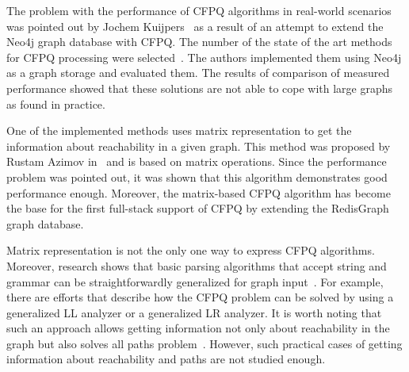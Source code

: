 The problem with the performance of CFPQ algorithms in real-world scenarios was pointed out by Jochem Kuijpers~\cite{10.1145/3335783.3335791} as a result of an attempt to extend the Neo4j graph database with CFPQ. The number of the state of the art methods for CFPQ processing were selected~\cite{10.1007/978-3-319-91662-0_17, hellingsRelational, 10.1145/3167132.3167265, 10.1145/3398682.3399163}. The authors implemented them using Neo4j as a graph storage and evaluated them. The results of comparison of measured performance showed that these solutions are not able to cope with large graphs as found in practice.

One of the implemented methods uses matrix representation to get the information about reachability in a given graph. This method was proposed by Rustam Azimov in~\cite{10.1145/3398682.3399163} and is based on matrix operations.
Since the performance problem was pointed out, it was shown that this algorithm demonstrates good performance enough. Moreover, the matrix-based CFPQ algorithm has become the base for the first full-stack support of CFPQ by extending the RedisGraph graph database. 

Matrix representation is not the only one way to express CFPQ algorithms. Moreover, research shows that basic parsing algorithms that accept string and grammar can be straightforwardly generalized for graph input~\cite{10.1145/3166094.3166104}. For example, there are efforts that describe how the CFPQ problem can be solved by using a generalized LL analyzer or a generalized LR analyzer.
It is worth noting that such an approach allows getting information not only about reachability in the graph but also solves all paths problem~\cite{10.1007/978-3-030-61133-0_7}. However, such practical cases of getting information about reachability and paths are not studied enough. 

